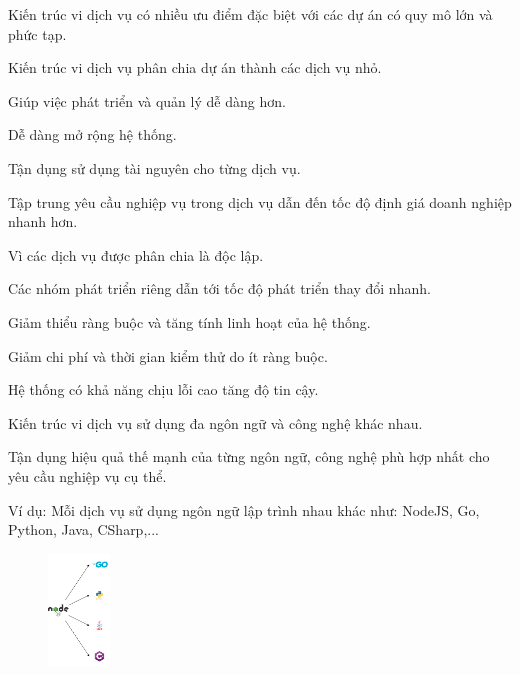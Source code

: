 Kiến trúc vi dịch vụ có nhiều ưu điểm đặc biệt với các dự án có quy mô lớn và phức tạp.

Kiến trúc vi dịch vụ phân chia dự án thành các dịch vụ nhỏ.

Giúp việc phát triển và quản lý dễ dàng hơn.

Dễ dàng mở rộng hệ thống.

Tận dụng sử dụng tài nguyên cho từng dịch vụ.

Tập trung yêu cầu nghiệp vụ trong dịch vụ dẫn đến tốc độ định giá doanh nghiệp nhanh hơn.

Vì các dịch vụ được phân chia là độc lập.



Các nhóm phát triển riêng dẫn tới tốc độ phát triển thay đổi nhanh.

Giảm thiểu ràng buộc và tăng tính linh hoạt của hệ thống.

Giảm chi phí và thời gian kiểm thử do ít ràng buộc.

Hệ thống có khả năng chịu lỗi cao tăng độ tin cậy.

Kiến trúc vi dịch vụ sử dụng đa ngôn ngữ và công nghệ khác nhau.

Tận dụng hiệu quả thế mạnh của từng ngôn ngữ, công nghệ phù hợp nhất cho yêu cầu nghiệp vụ cụ thể.

Ví dụ: Mỗi dịch vụ sử dụng ngôn ngữ lập trình nhau khác như: NodeJS, Go, Python, Java, CSharp,...

\begin{figure}[h]

\centering

\includegraphics[height = 3cm]{pictures/DaNgonNgu/_DaNgonNgu.png}


\end{figure}

